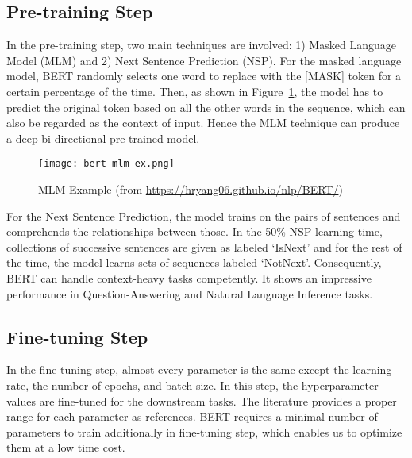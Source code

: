 \documentclass[letterpaper, 11pt]{article}
\begin{document}
\subsection{Pre-training Step}
\label{sec:pre-training-step}
In the pre-training step, two main techniques are involved: 1) Masked Language Model (MLM) and 2) Next Sentence Prediction (NSP). For the masked language model, BERT randomly selects one word to replace with the [MASK] token for a certain percentage of the time. Then, as shown in Figure~\ref{fig:bert-mlm}, the model has to predict the original token based on all the other words in the sequence, which can also be regarded as the context of input. Hence the MLM technique can produce a deep bi-directional pre-trained model.

\begin{figure}[h]
    \centering
    \texttt{[image: bert-mlm-ex.png]}
    \caption{MLM Example (from \url{https://hryang06.github.io/nlp/BERT/})}
    \label{fig:bert-mlm}
\end{figure}

For the Next Sentence Prediction, the model trains on the pairs of sentences and comprehends the relationships between those. In the 50\% NSP learning time, collections of successive sentences are given as labeled `IsNext' and for the rest of the time, the model learns sets of sequences labeled `NotNext'. Consequently, BERT can handle context-heavy tasks competently. It shows an impressive performance in Question-Answering and Natural Language Inference tasks.

\subsection{Fine-tuning Step}
\label{sec:fine-tuning-step}
In the fine-tuning step, almost every parameter is the same except the learning rate, the number of epochs, and batch size. In this step, the hyperparameter values are fine-tuned for the downstream tasks. The literature provides a proper range for each parameter as references. BERT requires a minimal number of parameters to train additionally in fine-tuning step, which enables us to optimize them at a low time cost.

\end{document}
